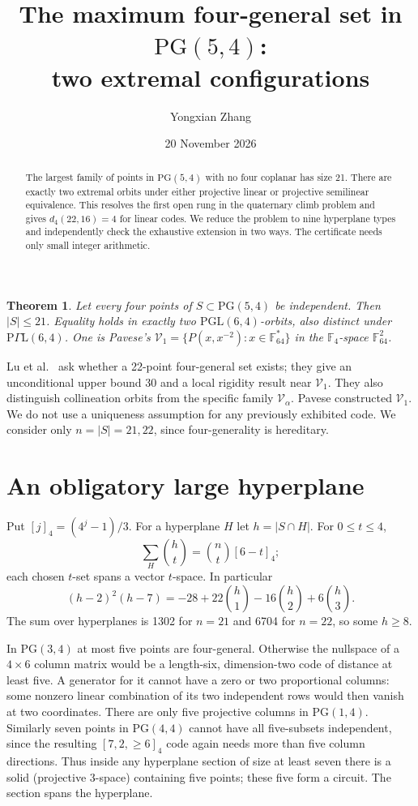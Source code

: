 \documentclass[10pt]{article}
\title{The maximum four-general set in $\mathrm{PG}(5,4)$:\\two extremal configurations}
\author{Yongxian Zhang}
\date{20 November 2026}
\newtheorem{theorem}{Theorem}
\newcommand{\F}{\mathbb F}
\newcommand{\PG}{\mathrm{PG}}
\newcommand{\PGL}{\mathrm{PGL}}
\newcommand{\sem}{\mathrm{P}\Gamma\mathrm L}
\begin{document}
\maketitle
\begin{abstract}
The largest family of points in $\PG(5,4)$ with no four coplanar has size 21. There are exactly two extremal orbits under either projective linear or projective semilinear equivalence. This resolves the first open rung in the quaternary climb problem and gives $d_4(22,16)=4$ for linear codes. We reduce the problem to nine hyperplane types and independently check the exhaustive extension in two ways. The certificate needs only small integer arithmetic.
\end{abstract}

\begin{theorem}
Let every four points of $S\subset\PG(5,4)$ be independent. Then $|S|\leq21$. Equality holds in exactly two $\PGL(6,4)$-orbits, also distinct under $\sem(6,4)$. One is Pavese's $\mathcal V_1=\{P(x,x^{-2}):x\in\F_{64}^*\}$ in the $\F_4$-space $\F_{64}^2$.
\end{theorem}
Lu et al.\ \cite[Sec.~8]{lu} ask whether a 22-point four-general set exists; they give an unconditional upper bound 30 and a local rigidity result near $\mathcal V_1$. They also distinguish collineation orbits from the specific family $\mathcal V_\alpha$. Pavese \cite[Thm.~4.6]{pav} constructed $\mathcal V_1$. We do not use a uniqueness assumption for any previously exhibited code. We consider only $n=|S|=21,22$, since four-generality is hereditary.

\section{An obligatory large hyperplane}
Put $[j]_4=(4^j-1)/3$. For a hyperplane $H$ let $h=|S\cap H|$. For $0\le t\le4$,
\[
  \sum_H {h\choose t}={n\choose t}[6-t]_4;
\]
each chosen $t$-set spans a vector $t$-space. In particular
\[
 (h-2)^2(h-7)=-28+22{h\choose1}-16{h\choose2}+6{h\choose3}.
\]
The sum over hyperplanes is 1302 for $n=21$ and 6704 for $n=22$, so some $h\ge8$.

In $\PG(3,4)$ at most five points are four-general. Otherwise the nullspace of a $4\times6$ column matrix would be a length-six, dimension-two code of distance at least five. A generator for it cannot have a zero or two proportional columns: some nonzero linear combination of its two independent rows would then vanish at two coordinates. There are only five projective columns in $\PG(1,4)$. Similarly seven points in $\PG(4,4)$ cannot have all five-subsets independent, since the resulting $[7,2,\ge6]_4$ code again needs more than five column directions. Thus inside any hyperplane section of size at least seven there is a solid (projective $3$-space) containing five points; these five form a circuit. The section spans the hyperplane.
\end{document}
